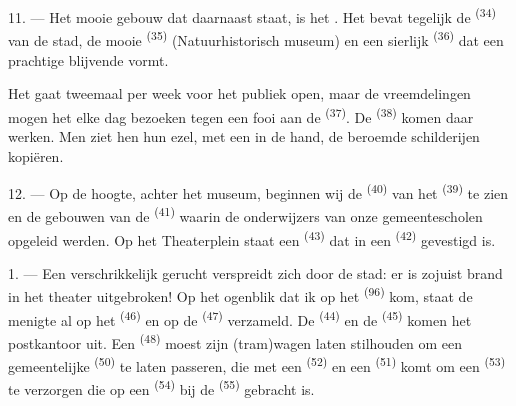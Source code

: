 \VUsaut{4.0mm}
\VUsaut{3.4mm}

11. --- Het mooie gebouw dat daarnaast staat, is het . Het bevat tegelijk de
 \textsuperscript{(34)} van de stad, de mooie
 \textsuperscript{(35)}
(Natuurhistorisch museum) en een sierlijk  \textsuperscript{(36)}
dat een prachtige blijvende  vormt.

Het gaat tweemaal per week voor het publiek open, maar de vreemdelingen mogen het elke dag
bezoeken tegen een fooi aan de  \textsuperscript{(37)}. De 
\textsuperscript{(38)} komen daar werken. Men ziet hen  hun ezel, met een
 in de hand, de beroemde schilderijen kopiëren.

12. --- Op de hoogte, achter het museum, beginnen wij de 
\textsuperscript{(40)} van het  \textsuperscript{(39)} te zien en de
gebouwen van de  \textsuperscript{(41)} waarin de onderwijzers van onze
gemeentescholen opgeleid werden. Op het Theaterplein staat een 
\textsuperscript{(43)} dat in een  \textsuperscript{(42)} gevestigd
is.

\VUsaut{5.0mm}
\VUsaut{3.0mm}

\VUsaut{3.4mm}

1. --- Een verschrikkelijk gerucht verspreidt zich door de stad: er is zojuist brand in het
theater uitgebroken! Op het ogenblik dat ik op het  \textsuperscript{(96)} kom,
staat de menigte al op het  \textsuperscript{(46)} en op de 
\textsuperscript{(47)} verzameld. De  \textsuperscript{(44)} en de
 \textsuperscript{(45)} komen het postkantoor uit. Een
 \textsuperscript{(48)} moest zijn (tram)wagen laten
stilhouden om een gemeentelijke  \textsuperscript{(50)} te laten passeren,
die met een  \textsuperscript{(52)} en een
 \textsuperscript{(51)} komt om een 
\textsuperscript{(53)} te verzorgen die op een  \textsuperscript{(54)} bij
de  \textsuperscript{(55)} gebracht is.

